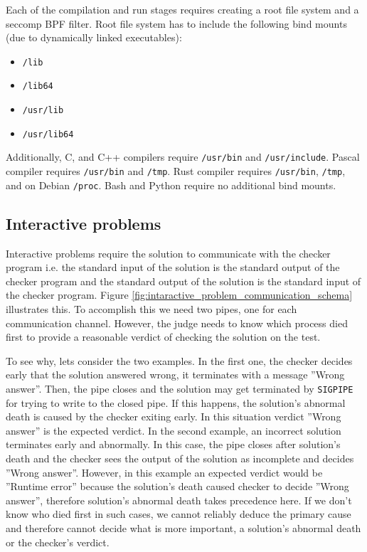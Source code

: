 \documentclass[en]{pracamgr}
\begin{document}
Each of the compilation and run stages requires creating a root file system and a seccomp BPF filter. Root file system has to include the following bind mounts (due to dynamically linked executables):
\begin{itemize}
    \item \texttt{/lib}
    \item \texttt{/lib64}
    \item \texttt{/usr/lib}
    \item \texttt{/usr/lib64}
\end{itemize}

Additionally, C, and C++ compilers require \texttt{/usr/bin} and \texttt{/usr/include}.
Pascal compiler requires \texttt{/usr/bin} and \texttt{/tmp}.
Rust compiler requires \texttt{/usr/bin}, \texttt{/tmp}, and on Debian \texttt{/proc}.
Bash and Python require no additional bind mounts.

\subsection{Interactive problems}

Interactive problems require the solution to communicate with the checker program i.e. the standard input of the solution is the standard output of the checker program and the standard output of the solution is the standard input of the checker program. Figure \ref{fig:intaractive_problem_communication_schema} illustrates this. To accomplish this we need two pipes, one for each communication channel. However, the judge needs to know which process died first to provide a reasonable verdict of checking the solution on the test.

To see why, lets consider the two examples. In the first one, the checker decides early that the solution answered wrong, it terminates with a message ''Wrong answer''. Then, the pipe closes and the solution may get terminated by \texttt{SIGPIPE} for trying to write to the closed pipe. If this happens, the solution's abnormal death is caused by the checker exiting early. In this situation verdict ''Wrong answer'' is the expected verdict. In the second example, an incorrect solution terminates early and abnormally. In this case, the pipe closes after solution's death and the checker sees the output of the solution as incomplete and decides ''Wrong answer''. However, in this example an expected verdict would be ''Runtime error'' because the solution's death caused checker to decide ''Wrong answer'', therefore solution's abnormal death takes precedence here. If we don't know who died first in such cases, we cannot reliably deduce the primary cause and therefore cannot decide what is more important, a solution's abnormal death or the checker's verdict.
\end{document}
